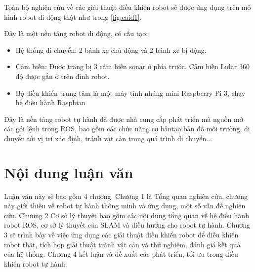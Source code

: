 Toàn bộ nghiên cứu về các giải thuật điều khiển robot sẽ được ứng dụng trên mô hình robot di động thật như trong \figurename{\ref{fig:eaid1}}. 

Đây là một nền tảng robot di động, có cấu tạo:
\begin{itemize}
	\item Hệ thống di chuyển: 2 bánh xe chủ động và 2 bánh xe bị động. 
	\item Cảm biến: Được trang bị 3 cảm biến sonar ở phía trước. Cảm biến Lidar 360 độ được gắn ở trên đỉnh robot.
	\item Bộ điều khiển trung tâm là một máy tính nhúng mini Raspberry Pi 3, chạy hệ điều hành Raspbian	
\end{itemize}

Đây là nền tảng robot tự hành đã được nhà cung cấp phát triển mã nguồn mở các gói lệnh trong ROS, bao gồm các chức năng cơ bảntạo bản đồ môi trường, di chuyển tới vị trí xác định, tránh vật cản trong quá trình di chuyển...

\section{Nội dung luận văn} 
Luận văn này sẽ bao gồm 4 chương. Chương 1 là Tổng quan nghiên cứu, chương này giới thiệu về robot tự hành thông minh và ứng dụng, một số vấn đề nghiên cứu. Chương 2 Cơ sở lý thuyêt bao gồm các nội dung tổng quan về hệ điều hành robot ROS, cơ sở lý thuyết của SLAM và điều hướng cho robot tự hành. Chương 3 sẽ trình bày về việc ứng dụng các giải thuật điều khiển robot để điều khiển robot thật, tích hợp giải thuật tránh vật cản và thử nghiệm, đánh giá kết quả của hệ thống. Chương 4 kết luận và đề xuất các phát triển, tối ưu trong điều khiển robot tự hành. 

